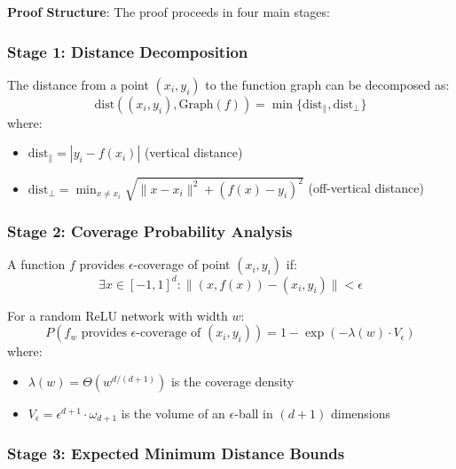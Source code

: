 \textbf{Proof Structure}: The proof proceeds in four main stages:

\subsubsection{Stage 1: Distance Decomposition}

\begin{lemma}
The distance from a point $(x_i, y_i)$ to the function graph can be decomposed as:
$$\text{dist}((x_i, y_i), \text{Graph}(f)) = \min \{\text{dist}_\parallel, \text{dist}_\perp\}$$
where:
\begin{itemize}
    \item $\text{dist}_\parallel = |y_i - f(x_i)|$ (vertical distance)
    \item $\text{dist}_\perp = \min_{x \neq x_i} \sqrt{\|x - x_i\|^2 + (f(x) - y_i)^2}$ (off-vertical distance)
\end{itemize}
\end{lemma}

\subsubsection{Stage 2: Coverage Probability Analysis}

\begin{definition}
A function $f$ provides $\epsilon$-coverage of point $(x_i, y_i)$ if:
$$\exists x \in [-1,1]^d : \|(x, f(x)) - (x_i, y_i)\| < \epsilon$$
\end{definition}

\begin{lemma}
For a random ReLU network with width $w$:
$$P(f_w \text{ provides } \epsilon\text{-coverage of } (x_i, y_i)) = 1 - \exp\left(-\lambda(w) \cdot V_\epsilon\right)$$
where:
\begin{itemize}
    \item $\lambda(w) = \Theta(w^{d/(d+1)})$ is the coverage density
    \item $V_\epsilon = \epsilon^{d+1} \cdot \omega_{d+1}$ is the volume of an $\epsilon$-ball in $(d+1)$ dimensions
\end{itemize}
\end{lemma}

\subsubsection{Stage 3: Expected Minimum Distance Bounds}

